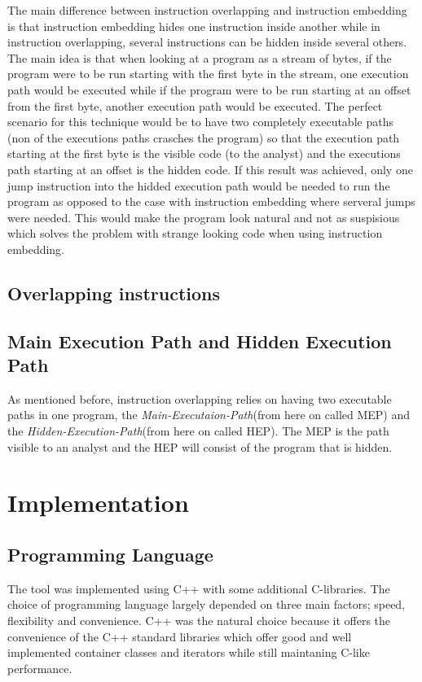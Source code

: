 \documentclass[11pt,twoside]{eitExjobb}
\begin{document}
The main difference between instruction overlapping and instruction embedding is that instruction embedding hides one instruction inside another while in instruction overlapping, several instructions can be hidden inside several others. The main idea is that when looking at a program as a stream of bytes, if the program were to be run starting with the first byte in the stream, one execution path would be executed while if the program were to be run starting at an offset from the first byte, another execution path would be executed. The perfect scenario for this technique would be to have two completely executable paths (non of the executions paths crasches the program) so that the execution path starting at the first byte is the visible code (to the analyst) and the executions path starting at an offset is the hidden code. If this result was achieved, only one jump instruction into the hidded execution path would be needed to run the program as opposed to the case with instruction embedding where serveral jumps were needed. This would make the program look natural and not as suspisious which solves the problem with strange looking code when using instruction embedding.\cite{instructionoverlapping}

\section{Overlapping instructions}


\section{Main Execution Path and Hidden Execution Path} 
As mentioned before, instruction overlapping relies on having two executable paths in one program, the \emph{Main-Executaion-Path}(from here on called MEP) and the \emph{Hidden-Execution-Path}(from here on called HEP). The MEP is the path visible to an analyst and the HEP will consist of the program that is hidden.  






\chapter{Implementation}
\section{Programming Language}
The tool was implemented using C++ with some additional C-libraries. The choice of programming language largely depended on three main factors; speed, flexibility and convenience. C++ was the natural choice because it offers the convenience of the C++ standard libraries which offer good and well implemented container classes and iterators while still maintaning C-like performance.
\end{document}

